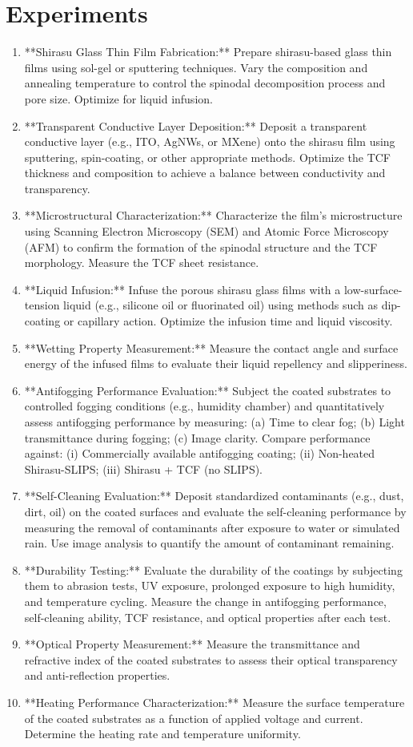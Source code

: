 \documentclass{article}
\begin{document}
\section{Experiments}
\begin{enumerate}
\item **Shirasu Glass Thin Film Fabrication:** Prepare shirasu-based glass thin films using sol-gel or sputtering techniques. Vary the composition and annealing temperature to control the spinodal decomposition process and pore size. Optimize for liquid infusion.
\item **Transparent Conductive Layer Deposition:** Deposit a transparent conductive layer (e.g., ITO, AgNWs, or MXene) onto the shirasu film using sputtering, spin-coating, or other appropriate methods. Optimize the TCF thickness and composition to achieve a balance between conductivity and transparency.
\item **Microstructural Characterization:** Characterize the film's microstructure using Scanning Electron Microscopy (SEM) and Atomic Force Microscopy (AFM) to confirm the formation of the spinodal structure and the TCF morphology. Measure the TCF sheet resistance.
\item **Liquid Infusion:** Infuse the porous shirasu glass films with a low-surface-tension liquid (e.g., silicone oil or fluorinated oil) using methods such as dip-coating or capillary action. Optimize the infusion time and liquid viscosity.
\item **Wetting Property Measurement:** Measure the contact angle and surface energy of the infused films to evaluate their liquid repellency and slipperiness.
\item **Antifogging Performance Evaluation:** Subject the coated substrates to controlled fogging conditions (e.g., humidity chamber) and quantitatively assess antifogging performance by measuring: (a) Time to clear fog; (b) Light transmittance during fogging; (c) Image clarity. Compare performance against: (i) Commercially available antifogging coating; (ii) Non-heated Shirasu-SLIPS; (iii) Shirasu + TCF (no SLIPS).
\item **Self-Cleaning Evaluation:** Deposit standardized contaminants (e.g., dust, dirt, oil) on the coated surfaces and evaluate the self-cleaning performance by measuring the removal of contaminants after exposure to water or simulated rain. Use image analysis to quantify the amount of contaminant remaining.
\item **Durability Testing:** Evaluate the durability of the coatings by subjecting them to abrasion tests, UV exposure, prolonged exposure to high humidity, and temperature cycling. Measure the change in antifogging performance, self-cleaning ability, TCF resistance, and optical properties after each test.
\item **Optical Property Measurement:** Measure the transmittance and refractive index of the coated substrates to assess their optical transparency and anti-reflection properties.
\item **Heating Performance Characterization:** Measure the surface temperature of the coated substrates as a function of applied voltage and current. Determine the heating rate and temperature uniformity.
\end{enumerate}
\end{document}
